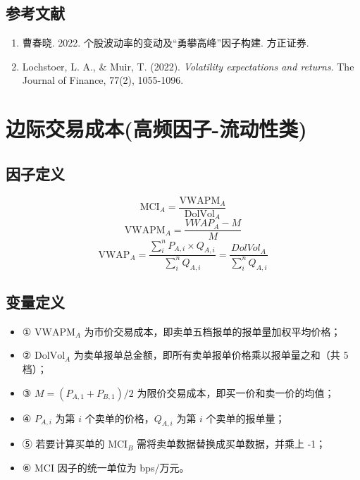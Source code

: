 \documentclass{article}
\begin{document}
\subsection{参考文献}
\begin{enumerate}
    \item 曹春晓. 2022. 个股波动率的变动及“勇攀高峰”因子构建. 方正证券.
    \item Lochstoer, L. A., \& Muir, T. (2022). \textit{Volatility expectations and returns}. The Journal of Finance, 77(2), 1055-1096.
\end{enumerate}

\section{边际交易成本(高频因子-流动性类)}

\subsection{因子定义}

\begin{equation}
    \mathrm{MCI}_A = \frac{\mathrm{VWAPM}_A }{\mathrm{DolVol}_A}
\end{equation}
\begin{equation}
    \mathrm{VWAPM}_A = \frac{VWAP_A-M}{M}
\end{equation}
\begin{equation}
    \mathrm{VWAP}_A = \frac{\sum_i^nP_{A,i} \times Q_{A,i}}{\sum_i^nQ_{A,i}} = \frac{DolVol_A}{\sum_i^n Q_{A,i}}
\end{equation}

\subsection{变量定义}
\begin{itemize}
    \item ① \( \mathrm{VWAPM}_A \) 为市价交易成本，即卖单五档报单的报单量加权平均价格；
    \item ② \( \mathrm{DolVol}_A \) 为卖单报单总金额，即所有卖单报单价格乘以报单量之和（共 5 档）；
    \item ③ \( M = (P_{A,1} + P_{B,1})/2 \) 为限价交易成本，即买一价和卖一价的均值；
    \item ④ \( P_{A,i} \) 为第 \( i \) 个卖单的价格，\( Q_{A,i} \) 为第 \( i \) 个卖单的报单量；
    \item ⑤ 若要计算买单的 \( \mathrm{MCI}_B \) 需将卖单数据替换成买单数据，并乘上 -1；
    \item ⑥ MCI 因子的统一单位为 bps/万元。
\end{itemize}
\end{document}
